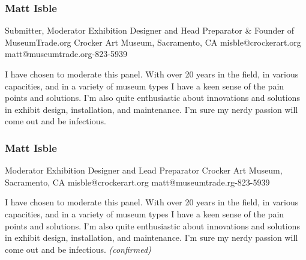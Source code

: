 \documentclass{report}
\begin{document}
              \subsubsection*{ Matt Isble }
              Submitter, Moderator\newline
              Exhibition Designer and Head Preparator \& Founder of MuseumTrade.org\newline
              Crocker Art Museum, Sacramento, CA
              \newline
              misble@crockerart.org\newline
              matt@museumtrade.org-823-5939\newline

              I have chosen to moderate this panel. With over 20 years in the field, in various capacities, and in a variety of museum types I have a keen sense of the pain points and solutions. I'm also quite enthusiastic about innovations and solutions in exhibit design, installation, and maintenance. I'm sure my nerdy passion will come out and be infectious.\newline


              
                \subsubsection*{ Matt Isble }
                Moderator\newline
                Exhibition Designer and Lead Preparator\newline
                Crocker Art Museum, Sacramento, CA
                \newline
                misble@crockerart.org\newline
                matt@museumtrade.rg-823-5939\newline

                I have chosen to moderate this panel. With over 20 years in the field, in various capacities, and in a variety of museum types I have a keen sense of the pain points and solutions. I'm also quite enthusiastic about innovations and solutions in exhibit design, installation, and maintenance. I'm sure my nerdy passion will come out and be infectious.\newline
                \emph{ (confirmed) }
              
\end{document}
